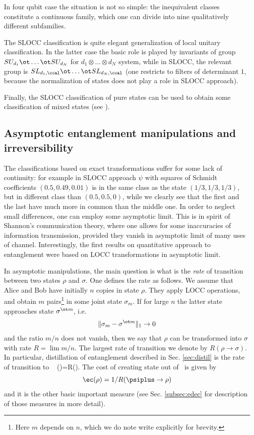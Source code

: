 \documentclass[twocolumn,aps,rmp]{revtex4}
\begin{document}
In four qubit case the situation is not so simple: the inequivalent
classes constitute a continuous family, which one can divide into nine
qualitatively different subfamilies.

The SLOCC classification is quite elegant generalization of local
unitary classification.  In the latter case the basic role is played
by invariants of group $SU_{d_1}\ot \ldots \ot SU_{d_N}$ for
$d_1\otimes \ldots \otimes d_N$ system, while in SLOCC, the relevant
group is $SL_{d_1,\ccal}\ot \ldots \ot SL_{d_N,\ccal}$ (one restricts
to filters of determinant $1$, because the normalization of states
does not play a role in SLOCC approach).

Finally, the SLOCC classification of pure states can be used to obtain
some classification of mixed states (see
\cite{AcinBLS2001-wghz-mixed,MiyakeV2003-22n}).


\subsection{Asymptotic entanglement manipulations and irreversibility}
\label{subsec:mixed_asym_trans}
The classifications based on exact transformations suffer for some
lack of continuity: for example in SLOCC approach $\psi$ with squares
of Schmidt coefficients $(0.5,0.49,0.01)$ is in the same class as the
state $(1/3,1/3,1/3)$, but in different class than $(0.5,0.5,0)$,
while we clearly see that the first and the last have much more in
common than the middle one. In order to neglect small differences, one
can employ some asymptotic limit. This is in spirit of Shannon's
communication theory, where one allows for some inaccuracies of
information transmission, provided they vanish in asymptotic limit of
many uses of channel. Interestingly, the first results on quantitative
approach to entanglement \cite{BBPS1996,BDSW1996,BBPSSW1996} were
based on LOCC transformations in asymptotic limit.

In asymptotic manipulations, the main question is what is the {\it
  rate} of transition between two states $\rho$ and $\sigma$. One defines the rate as follows. We assume that Alice and Bob have initially $n$ copies in state $\rho$. They apply LOCC operations, and obtain $m$ pairs\footnote{Here $m$ depends on $n$, which we do note write explicitly for brevity.} in some joint state
$\sigma_m$. If for large $n$ the latter state approaches state
$\sigma^{\ot m}$, i.e.
\begin{equation}
\|\sigma_m - \sigma^{\ot m}\|_1\to 0
\end{equation}
and the ratio $m/n$ does not vanish, then
we say that $\rho$ can be transformed into $\sigma$ with rate $R=\lim
m/n$. The largest rate of transition we denote by $R(\rho\to
\sigma)$. In particular, distillation of entanglement described in
Sec.  \ref{sec:distil} is the rate of transition to \eprstate\ \be
\ed(\rho)=R(\rho \to \psiplus). \ee The cost of creating state out of
\eprstates\ is given by \begin{equation} \ec(\rho)=1/R(\psiplus\to
  \rho) \end{equation} and it is the other basic important measure
(see Sec.  \ref{subsec:edec} for description of those measures in more
detail).
\end{document}
